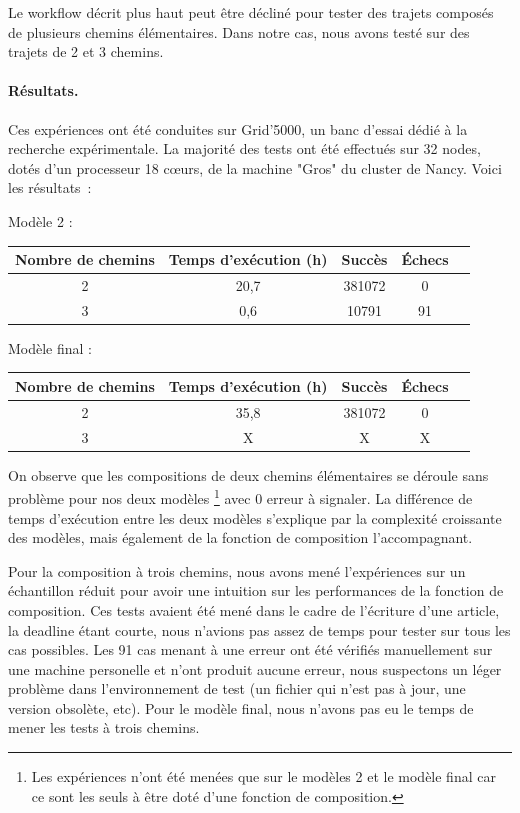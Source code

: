 \documentclass[oneside, a4paper, 11pt]{book}
\begin{document}
Le workflow décrit plus haut peut être décliné pour tester des trajets composés de plusieurs chemins élémentaires. Dans notre cas, nous avons testé sur des trajets de 2 et 3 chemins.

\paragraph{Résultats.} 
Ces expériences ont été conduites sur Grid'5000, un banc d'essai dédié à la recherche expérimentale. La majorité des tests ont été effectués sur 32 nodes, dotés d'un processeur 18 cœurs, de la machine "Gros" du cluster de Nancy.
Voici les résultats~:

\begin{center}
	Modèle 2 :
\begin{tabular}{|c|c|c|c|c|}
	\hline
	Nombre de chemins & Temps d'exécution (h) & Succès & Échecs\\
	\hline
	2 & 20,7 & 381072 & 0 \\
	\hline
	3 & 0,6  & 10791 & 91 \\
	\hline
\end{tabular}
\end{center}

\begin{center}
	Modèle final :
\begin{tabular}{|c|c|c|c|c|}
	\hline
	Nombre de chemins & Temps d'exécution (h) & Succès & Échecs\\
	\hline
	2 & 35,8 & 381072 & 0 \\
	\hline
	3 & X  & X & X \\
	\hline
\end{tabular}
\end{center}

On observe que les compositions de deux chemins élémentaires se déroule sans problème pour nos deux modèles \footnote{Les expériences n'ont été menées que sur le modèles 2 et le modèle final car ce sont les seuls à être doté d'une fonction de composition.} avec 0 erreur à signaler.
La différence de temps d'exécution entre les deux modèles s'explique par la complexité croissante des modèles, mais également de la fonction de composition l'accompagnant.

Pour la composition à trois chemins, nous avons mené l'expériences sur un échantillon réduit pour avoir une intuition sur les performances de la fonction de composition. Ces tests avaient été mené dans le cadre de l'écriture d'une article, la deadline étant courte, nous n'avions pas assez de temps pour tester sur tous les cas possibles.
Les 91 cas menant à une erreur ont été vérifiés manuellement sur une machine personelle et n'ont produit aucune erreur, nous suspectons un léger problème dans l'environnement de test (un fichier qui n'est pas à jour, une version obsolète, etc).  
Pour le modèle final, nous n'avons pas eu le temps de mener les tests à trois chemins.
\end{document}
